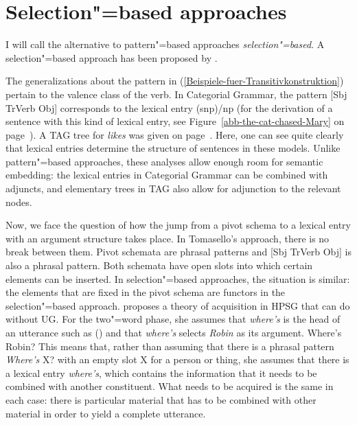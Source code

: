 \section{Selection"=based approaches}
\label{Abschnitt-Selektionsbasierter-Spracherwerb}

I will call the alternative to pattern"=based approaches \emph{selection"=based}. A selection"=based approach has
been proposed by \citet{Green-Grammar-Growth}.  

The generalizations about the pattern in (\ref{Beispiele-fuer-Transitivkonstruktion}) pertain to the valence class of the verb.
In Categorial Grammar, the pattern [Sbj TrVerb Obj] corresponds to the lexical entry (s\bs np)/np (for the derivation of a sentence
with this kind of lexical entry, see Figure~\ref{abb-the-cat-chased-Mary} on page~\pageref{abb-the-cat-chased-Mary}).
A TAG tree for \emph{likes} was given on page~\pageref{Abbildung-Max-likes-Anouk}.
Here, one can see quite clearly that lexical entries determine the structure of sentences in these models. Unlike pattern"=based approaches, these analyses allow
enough room for semantic embedding: the lexical entries in Categorial Grammar can be combined with adjuncts, and elementary trees in TAG also allow for adjunction
to the relevant nodes.

Now, we face the question of how the jump from a pivot schema to a lexical entry with an argument structure takes place. In Tomasello's approach, there is no break between them. Pivot schemata
are phrasal patterns and [Sbj TrVerb Obj] is also a phrasal pattern. Both schemata have open slots into which certain elements can be inserted.
In selection"=based approaches, the situation is similar: the elements that are fixed in the pivot schema are functors in the selection"=based approach.
\citet{Green-Grammar-Growth} proposes a theory of acquisition in HPSG that can do without UG. For the two"=word phase, she assumes that  \emph{where's} is the head
of an utterance such as () and that \emph{where's} selects \emph{Robin} as its argument.
\ea
Where's Robin?
\z
This means that, rather than assuming that there is a phrasal pattern \emph{Where's} X? with an empty slot X for a person
or thing, she assumes that there is a lexical entry \emph{where's}, which contains the information that it  needs to be combined
with another constituent. What needs to be acquired is the same in each case: there is particular material that has to be combined
with other material in order to yield a complete utterance.

